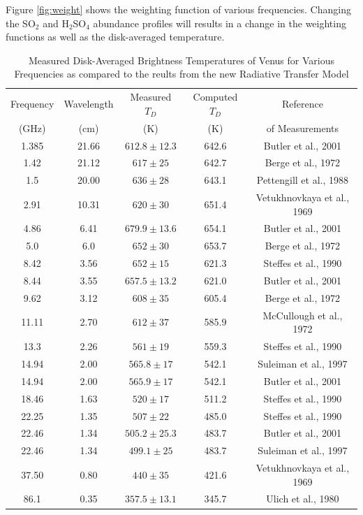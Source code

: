 Figure \ref{fig:weight} shows the weighting function of various frequencies. Changing the SO$_2$ and H$_2$SO$_4$ abundance profiles will results in a change in the weighting functions as well as the disk-averaged temperature.
\begin{table}[h]
 \centering 
\caption{Measured Disk-Averaged Brightness Temperatures of Venus for Various Frequencies as compared to the reults from the new Radiative Transfer Model}
\begin{tabular}{||c|c|c|c|c||}
\hline
Frequency & Wavelength & Measured $T_D$ & Computed $T_D$ & Reference\\
(GHz) & (cm) &(K)&(K)& of Measurements\\
\hline
1.385 	& 21.66	 	&$612.8 \pm 12.3$	&642.6  &Butler et al., 2001 			\cite{Butler-2001}\\
1.42 	& 21.12 	&$617 	\pm 25$		&642.7  &Berge et al., 1972 			\cite{Berge-1972}\\
1.5 	& 20.00 	&$636 	\pm 28$		&643.1  &Pettengill et al., 1988 		\cite{Pettengill-1988}\\
2.91 	& 10.31 	&$620 	\pm 30$		&651.4  &Vetukhnovkaya et al., 1969 	\cite{Vetukhnovkaya-1969}\\
4.86 	& 6.41	 	&$679.9 \pm 13.6$	&654.1  &Butler et al., 2001 			\cite{Butler-2001}\\
5.0 	& 6.0 		&$652 	\pm 30$		&653.7  &Berge et al., 1972 			\cite{Berge-1972}\\
8.42 	& 3.56	 	&$652 	\pm 15$		&621.3  &Steffes et al., 1990 			\cite{Steffes-1990}\\
8.44 	& 3.55	 	&$657.5 \pm 13.2$	&621.0  &Butler et al., 2001 			\cite{Butler-2001}\\
9.62 	& 3.12	 	&$608 	\pm 35$		&605.4  &Berge et al., 1972 			\cite{Berge-1972}\\
11.11 	& 2.70	 	&$612 	\pm 37$		&585.9  &McCullough et al., 1972 		\cite{McCullough-1972}\\
13.3	& 2.26	 	&$561 	\pm 19$		&559.3  &Steffes et al., 1990			\cite{Steffes-1990}\\
14.94 	& 2.00	 	&$565.8 \pm 17$		&542.1  &Suleiman et al., 1997 			\cite{Suleiman-thesis}\\
14.94 	& 2.00	 	&$565.9 \pm 17$		&542.1  &Butler et al., 2001 			\cite{Butler-2001}\\
18.46 	& 1.63	 	&$520 	\pm 17$		&511.2  &Steffes et al., 1990			\cite{Steffes-1990}\\
22.25 	& 1.35	 	&$507 	\pm 22$		&485.0  &Steffes et al., 1990			\cite{Steffes-1990}\\
22.46 	& 1.34	 	&$505.2 \pm 25.3$	&483.7  &Butler et al., 2001 			\cite{Butler-2001}\\
22.46 	& 1.34	 	&$499.1 \pm 25$		&483.7  &Suleiman et al., 1997 			\cite{Suleiman-thesis}\\
37.50 	& 0.80	 	&$440 	\pm 35$		&421.6  &Vetukhnovkaya et al., 1969 	\cite{Vetukhnovkaya-1969}\\
86.1 	& 0.35	 	&$357.5	\pm 13.1$	&345.7  &Ulich et al., 1980 			\cite{Ulich-1980}\\
\hline
\end{tabular}
\label{tab:rtm-results}
\end{table}

